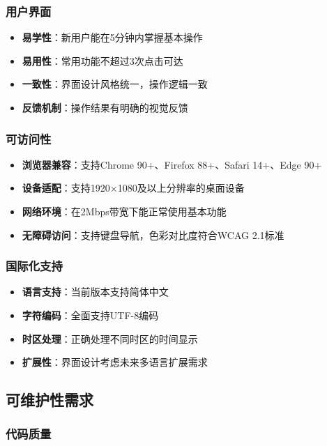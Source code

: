 \documentclass[a4paper]{article}
\begin{document}
\subsubsection{用户界面}

\begin{itemize}
    \item \textbf{易学性}：新用户能在5分钟内掌握基本操作
    \item \textbf{易用性}：常用功能不超过3次点击可达
    \item \textbf{一致性}：界面设计风格统一，操作逻辑一致
    \item \textbf{反馈机制}：操作结果有明确的视觉反馈
\end{itemize}

\subsubsection{可访问性}

\begin{itemize}
    \item \textbf{浏览器兼容}：支持Chrome 90+、Firefox 88+、Safari 14+、Edge 90+
    \item \textbf{设备适配}：支持1920×1080及以上分辨率的桌面设备
    \item \textbf{网络环境}：在2Mbps带宽下能正常使用基本功能
    \item \textbf{无障碍访问}：支持键盘导航，色彩对比度符合WCAG 2.1标准
\end{itemize}

\subsubsection{国际化支持}

\begin{itemize}
    \item \textbf{语言支持}：当前版本支持简体中文
    \item \textbf{字符编码}：全面支持UTF-8编码
    \item \textbf{时区处理}：正确处理不同时区的时间显示
    \item \textbf{扩展性}：界面设计考虑未来多语言扩展需求
\end{itemize}

\subsection{可维护性需求}

\subsubsection{代码质量}
\end{document}
